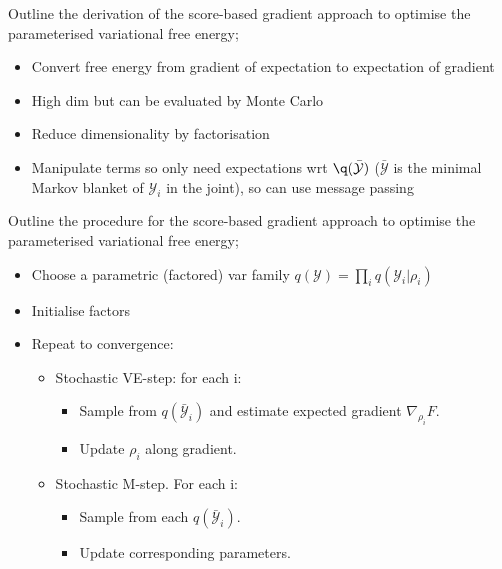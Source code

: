 \documentclass{article}
\begin{document}
Outline the derivation of the score-based gradient approach to optimise the parameterised variational free energy; \begin{itemize}
    \item Convert free energy from gradient of expectation to expectation of gradient
    \item High dim but can be evaluated by Monte Carlo
    \item Reduce dimensionality by factorisation
    \item Manipulate terms so only need expectations wrt $\q(\bar{\mathcal{Y}})$ ($\bar{\mathcal{Y}}$ is the minimal Markov blanket of $\mathcal{Y}_i$ in the joint), so can use message passing
\end{itemize}

Outline the procedure for the score-based gradient approach to optimise the parameterised variational free energy; \begin{itemize}
    \item Choose a parametric (factored) var family $q(\mathcal{Y}) = \prod_i q(\mathcal{Y}_i| \rho_i)$
    \item Initialise factors
    \item Repeat to convergence: \begin{itemize}
        \item Stochastic VE-step: for each i: \begin{itemize}
            \item Sample from $q(\bar{\mathcal{Y}}_i)$ and estimate expected gradient $\nabla_{\rho_i}F$.
            \item Update $\rho_i$ along gradient.
        \end{itemize}
        \item Stochastic M-step. For each i:
        \begin{itemize}
            \item Sample from each $q(\bar{\mathcal{Y}}_i)$.
            \item Update corresponding parameters.
        \end{itemize}
    \end{itemize}
\end{itemize} 
\end{document}
